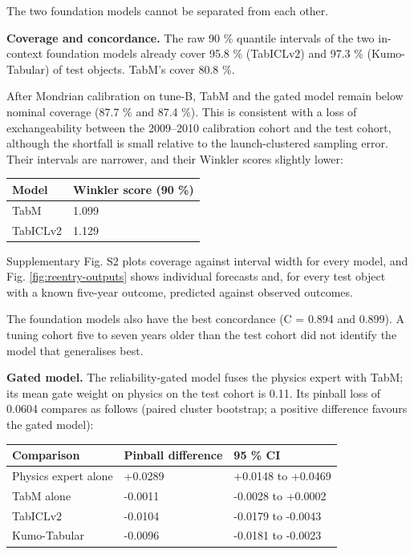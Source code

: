 \documentclass[
]{article}
\newcounter{none} %
\begin{document}
The two foundation models cannot be separated from each other.

\textbf{Coverage and concordance.} The raw 90 \% quantile intervals of
the two in-context foundation models already cover 95.8 \% (TabICLv2)
and 97.3 \% (Kumo-Tabular) of test objects. TabM's cover 80.8 \%.

After Mondrian calibration on tune-B, TabM and the gated model remain
below nominal coverage (87.7 \% and 87.4 \%). This is consistent with a
loss of exchangeability between the 2009--2010 calibration cohort and
the test cohort, although the shortfall is small relative to the
launch-clustered sampling error. Their intervals are narrower, and their
Winkler scores slightly lower:

{\def\LTcaptype{none} %
\begin{longtable}[]{@{}ll@{}}
\toprule\noalign{}
Model & Winkler score (90 \%) \\
\midrule\noalign{}
\endhead
\bottomrule\noalign{}
\endlastfoot
TabM & 1.099 \\
TabICLv2 & 1.129 \\
\end{longtable}
}

Supplementary Fig. S2 plots coverage against interval width for every
model, and Fig. \ref{fig:reentry-outputs} shows individual forecasts
and, for every test object with a known five-year outcome, predicted
against observed outcomes.

The foundation models also have the best concordance (C = 0.894 and
0.899). A tuning cohort five to seven years older than the test cohort
did not identify the model that generalises best.

\textbf{Gated model.} The reliability-gated model fuses the physics
expert with TabM; its mean gate weight on physics on the test cohort is
0.11. Its pinball loss of 0.0604 compares as follows (paired cluster
bootstrap; a positive difference favours the gated model):

{\def\LTcaptype{none} %
\begin{longtable}[]{@{}lll@{}}
\toprule\noalign{}
Comparison & Pinball difference & 95 \% CI \\
\midrule\noalign{}
\endhead
\bottomrule\noalign{}
\endlastfoot
Physics expert alone & +0.0289 & +0.0148 to +0.0469 \\
TabM alone & -0.0011 & -0.0028 to +0.0002 \\
TabICLv2 & -0.0104 & -0.0179 to -0.0043 \\
Kumo-Tabular & -0.0096 & -0.0181 to -0.0023 \\
\end{longtable}
}
\end{document}

